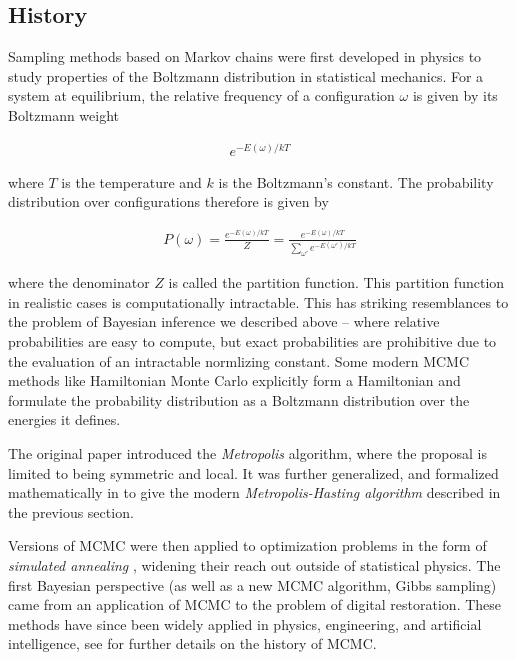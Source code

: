 \subsection{History}
Sampling methods based on Markov chains were first developed in physics to study properties of the Boltzmann distribution in statistical mechanics. \cite{metropolis1953equation} For a system at equilibrium, the relative frequency of a configuration $\omega$ is given by its Boltzmann weight

\begin{align}
e ^{-E(\omega) / kT}
\end{align}

where $T$ is the temperature and $k$ is the Boltzmann's constant. The probability distribution over configurations therefore is given by 

\begin{align}
P(\omega) = \frac{ e ^{-E(\omega) / kT}} {Z} = \frac{ e ^{-E(\omega) / kT}} {\sum_{\omega'} e ^{-E(\omega') / kT}}
\end{align}

where the denominator $Z$ is called the partition function. This partition function in realistic cases is computationally intractable. This has striking resemblances to the problem of Bayesian inference we described above -- where relative probabilities are easy to compute, but exact probabilities are prohibitive due to the evaluation of an intractable normlizing constant. Some modern MCMC methods like Hamiltonian Monte Carlo\citep{neal1993probabilistic} explicitly form a Hamiltonian and formulate the probability distribution as a Boltzmann distribution over the energies it defines.

The original paper \citet{metropolis1953equation} introduced the \textit{Metropolis} algorithm, where the proposal is limited to being symmetric and local. It was further generalized, and formalized mathematically in \citet{hastings1970monte} to give the modern \textit{Metropolis-Hasting algorithm} described in the previous section.

Versions of MCMC were then applied to optimization problems in the form of \textit{simulated annealing} \cite{kirkpatrick1983optimization}, widening their reach out outside of statistical physics. The first Bayesian perspective (as well as a new MCMC algorithm, Gibbs sampling) came from an application of MCMC to the problem of digital restoration\cite{geman1984stochastic}. These methods have since been widely applied in physics, engineering, and artificial intelligence, see \citet{richey2010evolution} for further details on the history of MCMC.


